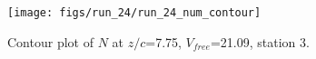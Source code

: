\begin{figure}[H]
\centering
\texttt{[image: figs/run\_24/run\_24\_num\_contour]}
\caption{Contour plot of $N$ at $z/c$=7.75, $V_{free}$=21.09, station 3.}
\label{fig:run_24_num_contour}
\end{figure}


